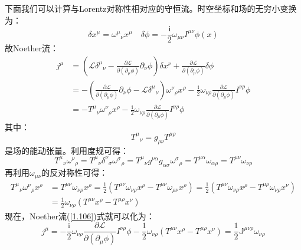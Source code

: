 \documentclass{book}
\begin{document}
下面我们可以计算与Lorentz对称性相对应的守恒流。时空坐标和场的无穷小变换为：
\begin{equation}
	\delta x^\mu=\omega^\mu{}_\nu x^\mu\quad \delta\phi=-\frac{\mathrm{i}}{2}\omega_{\mu\nu}I^{\mu\nu}\phi(x)
\end{equation}
故Noether流：
\begin{equation}
	\begin{aligned}
		j^\mu&=\left(\mathscr{L}\delta^\mu{}_\nu-\frac{\partial\mathscr{L}}{\partial(\partial_\mu\phi)}\partial_\nu\phi\right)\delta x^\nu+\frac{\partial\mathscr{L}}{\partial(\partial_\mu\phi)}\delta\phi \\
		&=-\left(\frac{\partial\mathscr{L}}{\partial(\partial_\mu\phi)}\partial_\nu\phi-\mathscr{L}\delta^\mu{}_\nu\right)\omega^\nu{}_\rho x^\rho-\frac{\mathrm{i}}{2}\omega_{\nu\rho}\frac{\partial\mathscr{L}}{\partial(\partial_\mu\phi)}I^{\nu\rho}\phi\\&=-T^\mu{}_\nu\omega^\nu{}_\rho x^\rho-\frac{\mathrm{i}}{2}\omega_{\nu\rho}\frac{\partial\mathscr{L}}{\partial(\partial_\mu\phi)}I^{\nu\rho}\phi
	\end{aligned}
	\label{1.106}
\end{equation}
其中：
\begin{equation}
	T^\mu{}_\nu=g_{\rho\nu}T^{\mu\rho}
\end{equation}
是场的能动张量。利用度规可得：
\begin{equation}
	T^\mu{}_\nu\omega^{\nu}{}_\rho=T^{\mu}{}_{\nu}\delta^{\nu}{}_{\sigma}\omega^{\sigma}{}_{\rho}=T^{\mu}{}_{\nu}g^{\nu\alpha}g_{\alpha\sigma}\omega^{\sigma}{}_{\rho}=T^{\mu\alpha}\omega_{\alpha\rho}=T^{\mu\nu}\omega_{\nu\rho}
\end{equation}
再利用$\omega_{\mu\nu}$的反对称性可得：
\begin{equation}
	\begin{aligned}
		T^{\mu}{}_{\nu}\omega^{\nu}{}_{\rho}x^{\rho}&=T^{\mu\nu}\omega_{\nu\rho}x^{\rho}=\frac{1}{2}(T^{\mu\nu}\omega_{\nu\rho}x^{\rho}-T^{\mu\nu}\omega_{\rho\nu}x^{\rho})=\frac{1}{2}(T^{\mu\nu}\omega_{\nu\rho}x^{\rho}-T^{\mu\rho}\omega_{\nu\rho}x^{\nu}) \\
&=\frac12\omega_{\nu\rho}(T^{\mu\nu}x^\rho-T^{\mu\rho}x^\nu)
	\end{aligned}
\end{equation}
现在，Noether流(\ref{1.106})式就可以化为：
\begin{equation}
	j^{\mu}=-\frac{{\mathrm{i}}}{2}\omega_{\nu\rho}\frac{\partial\mathscr{L}}{\partial(\partial_{\mu}\phi)}I^{\nu\rho}\phi-\frac{1}{2}\omega_{\nu\rho}(T^{\mu\nu}x^{\rho}-T^{\mu\rho}x^{\nu})=\frac{1}{2}\mathbb{J}^{\mu\nu\rho}\omega_{\nu\rho}
\end{equation}
\end{document}
